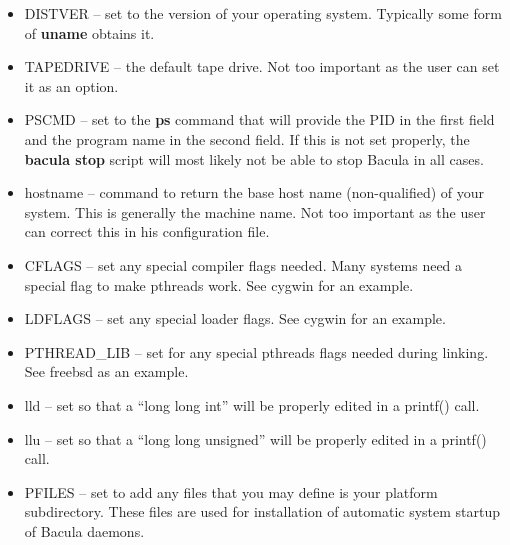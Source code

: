 \begin{itemize}
\begin{itemize}
\item DISTVER -- set to the version of your operating system. Typically  some
   form of {\bf uname} obtains it.
\item TAPEDRIVE -- the default tape drive. Not too important as the user  can
   set it as an option.
\item PSCMD -- set to the {\bf ps} command that will provide the PID  in the
   first field and the program name in the second field. If this  is not set
   properly, the {\bf bacula stop} script will most likely  not be able to stop
Bacula in all cases.
\item hostname -- command to return the base host name (non-qualified)  of
   your system. This is generally the machine name. Not too important  as the
   user can correct this in his configuration file.
\item CFLAGS -- set any special compiler flags needed. Many systems need  a
   special flag to make pthreads work. See cygwin for an example.
\item LDFLAGS -- set any special loader flags. See cygwin for an example.
\item PTHREAD\_LIB -- set for any special pthreads flags needed during
   linking. See freebsd as an example.
\item lld -- set so that a ``long long int'' will be properly edited in  a
   printf() call.
\item llu -- set so that a ``long long unsigned'' will be properly edited in
   a printf() call.
\item PFILES -- set to add any files that you may define is your platform
   subdirectory. These files are used for installation of automatic  system
   startup of Bacula daemons.
\end{itemize}


\end{itemize}
